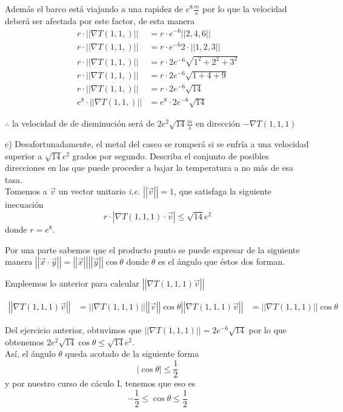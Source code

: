 \documentclass[letterpaper]{article}
\providecommand{\abs}[1]{\left|#1\right|}
\providecommand{\norm}[1]{\left|\left|#1\right|\right|}
\renewcommand{\*}{\cdot}
\theoremstyle{definition}
\begin{document}
Además el barco está viajando a una rapidez de $ e^8 \frac{m}{s} $ por lo que la velocidad deberá ser afectada por este factor, de esta manera
\begin{align*}
	r\*\norm{\nabla T(1,1,)} &= r\* e^{-6}\norm{2,4,6}\\
	r\*\norm{\nabla T(1,1,)} &= r\* e^{-6}2\*\norm{1,2,3}\\
	r\*\norm{\nabla T(1,1,)} &= r\* 2e^{-6}\sqrt{1^2 + 2^2 + 3^2}\\
	r\*\norm{\nabla T(1,1,)} &= r\* 2e^{-6}\sqrt{1+4+9}\\
	r\*\norm{\nabla T(1,1,)} &= r\* 2e^{-6}\sqrt{14}\\
	e^8\*\norm{\nabla T(1,1,)} &= e^8\* 2e^{-6}\sqrt{14}
\end{align*}
\begin{center}
	$ \therefore $ la velocidad de de disminución será de $ 2e^2\sqrt{14} \frac{m}{s}$ en dirección $ - \nabla T(1,1,1) $ \\
\end{center}


c) Desafortunadamente, el metal del casco se romperá si se enfría a una velocidad superior a $\sqrt{14}e^2$ grados por segundo. Describa el conjunto de posibles direcciones en las que puede proceder a bajar la temperatura a no más de esa tasa.\\

Tomemos a $ \vec{v} $ un vector unitario \textit{i.e.} $ \norm{\vec{v}} = 1 $, que satisfaga la siguiente inecuación
\[ r\* \abs{\nabla T(1,1,1) \* \vec{v}} \leq \sqrt{14}e^2 \]
donde $ r = e^8 $.

Por una parte sabemos que el producto punto se puede expresar de la siguiente manera $ \norm{\vec{x} \* \vec{y}} = \norm{\vec{x}}\norm{\vec{y}}\cos\theta $ donde $ \theta $ es el ángulo que éstos dos forman. 

Empleemos lo anterior para calcular $ \norm{\nabla T(1,1,1) \vec{v} } $

\begin{align*}
	 \norm{\nabla T(1,1,1) \vec{v} } &= \norm{\nabla T(1,1,1)} \norm{\vec{v}}\cos\theta
	 \norm{\nabla T(1,1,1) \vec{v} } &= \norm{\nabla T(1,1,1)}\cos\theta
\end{align*}

Del ejercicio anterior, obtuvimos que $ \norm{\nabla T(1,1,1)} =  2e^{-6}\sqrt{14} $  por lo que obtenemos $ 2e^{2}\sqrt{14} \cos\theta \leq \sqrt{14}e^2$.\\

Así, el ángulo $  \theta $ queda acotado de la siguiente forma
\[ \abs{\cos \theta} \leq \dfrac{1}{2} \] y por nuestro curso de cáculo I, tenemos que eso es \[  -\dfrac{1}{2} \leq \cos \theta \leq \dfrac{1}{2} \]
\end{document}
